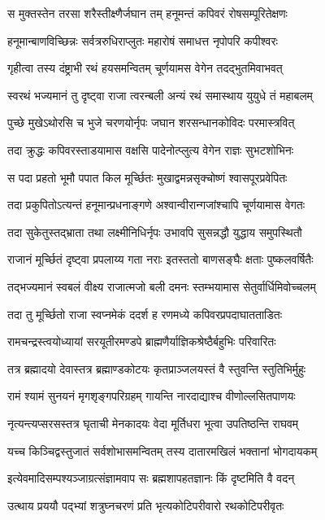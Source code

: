 \twolineshloka
{स मुक्तस्तेन तरसा शरैस्तीक्ष्णैर्जघान तम्}
{हनूमन्तं कपिवरं रोषसम्पूरितेक्षणः}%

\twolineshloka
{हनूमान्बाणविच्छिन्नः सर्वत्ररुधिराप्लुतः}
{महारोषं समाधत्त नृपोपरि कपीश्वरः}%

\twolineshloka
{गृहीत्वा तस्य दंष्ट्राभी रथं हयसमन्वितम्}
{चूर्णयामस वेगेन तदद्भुतमिवाभवत्}%

\twolineshloka
{स्वरथं भज्यमानं तु दृष्ट्वा राजा त्वरन्बली}
{अन्यं रथं समास्थाय युयुधे तं महाबलम्}%

\twolineshloka
{पुच्छे मुखेऽथोरसि च भुजे चरणयोर्नृपः}
{जघान शरसन्धानकोविदः परमास्त्रवित्}%

\twolineshloka
{तदा क्रुद्धः कपिवरस्ताडयामास वक्षसि}
{पादेनोत्प्लुत्य वेगेन राज्ञः सुभटशोभिनः}%

\twolineshloka
{स पदा प्रहतो भूमौ पपात किल मूर्च्छितः}
{मुखाद्वमन्नसृक्चोष्णं श्वासपूरप्रवेपितः}%

\twolineshloka
{तदा प्रकुपितोऽत्यन्तं हनूमान्प्रधनाङ्गणे}
{अश्वान्वीरान्गजांश्चापि चूर्णयामास वेगतः}%

\twolineshloka
{तदा सुकेतुस्तद्भ्राता तथा लक्ष्मीनिधिर्नृपः}
{उभावपि सुसन्नद्धौ युद्धाय समुपस्थितौ}%

\twolineshloka
{राजानं मूर्च्छितं दृष्ट्वा प्रपलाय्य गता नराः}
{इतस्ततो बाणसङ्घैः क्षताः पुष्कलवर्षितैः}%

\twolineshloka
{तद्भज्यमानं स्वबलं वीक्ष्य राजात्मजो बली}
{दमनः स्तम्भयामास सेतुर्वार्धिमिवोच्चलम्}%

\twolineshloka
{तदा तु मूर्च्छितो राजा स्वप्नमेकं ददर्श ह}
{रणमध्ये कपिवरप्रपदाघातताडितः}%

\twolineshloka
{रामचन्द्रस्त्वयोध्यायां सरयूतीरमण्डपे}
{ब्राह्मणैर्याज्ञिकश्रेष्ठैर्बहुभिः परिवारितः}%

\twolineshloka
{तत्र ब्रह्मादयो देवास्तत्र ब्रह्माण्डकोटयः}
{कृतप्राञ्जलयस्तं वै स्तुवन्ति स्तुतिभिर्मुहुः}%

\twolineshloka
{रामं श्यामं सुनयनं मृगशृङ्गपरिग्रहम्}
{गायन्ति नारदाद्याश्च वीणोल्लसितपाणयः}%

\twolineshloka
{नृत्यन्त्यप्सरसस्तत्र घृताची मेनकादयः}
{वेदा मूर्तिधरा भूत्वा उपतिष्ठन्ति राघवम्}%

\twolineshloka
{यच्च किञ्चिद्वस्तुजातं सर्वशोभासमन्वितम्}
{तस्य दातारमखिलं भक्तानां भोगदायकम्}%

\twolineshloka
{इत्येवमादिसम्पश्यञ्जाग्रत्संज्ञामवाप सः}
{ब्रह्मशापहतज्ञानः किं दृष्टमिति वै वदन्}%

\twolineshloka
{उत्थाय प्रययौ पद्भ्यां शत्रुघ्नचरणं प्रति}
{भृत्यकोटिपरीवारो रथकोटिपरीवृतः}%

